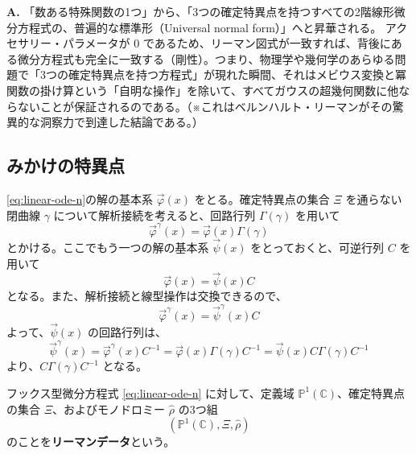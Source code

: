 \begin{Q}
\textbf{A.} 「数ある特殊関数の1つ」から、「3つの確定特異点を持つすべての2階線形微分方程式の、普遍的な標準形（Universal normal form）」へと昇華される。
アクセサリー・パラメータが $0$ であるため、リーマン図式が一致すれば、背後にある微分方程式も完全に一致する（剛性）。つまり、物理学や幾何学のあらゆる問題で「3つの確定特異点を持つ方程式」が現れた瞬間、それはメビウス変換と冪関数の掛け算という「自明な操作」を除いて、すべてガウスの超幾何関数に他ならないことが保証されるのである。（※これはベルンハルト・リーマンがその驚異的な洞察力で到達した結論である。）
\end{Q}

\subsection{みかけの特異点}
\eqref{eq:linear-ode-n}の解の基本系 $\vec{\varphi}(x)$ をとる。確定特異点の集合 $\Xi$ を通らない閉曲線 $\gamma$ について解析接続を考えると、回路行列 $\Gamma(\gamma)$ を用いて
\[
\vec{\varphi}^{\gamma}(x) = \vec{\varphi}(x)\Gamma(\gamma)
\]
とかける。ここでもう一つの解の基本系 $\vec{\psi}(x)$ をとっておくと、可逆行列 $C$ を用いて
\[
\vec{\varphi}(x) = \vec{\psi}(x)C
\]
となる。また、解析接続と線型操作は交換できるので、
\[
\vec{\varphi}^{\gamma}(x) = \vec{\psi}^{\gamma}(x)C
\]
よって、$\vec{\psi}(x)$ の回路行列は、
\[
\vec{\psi}^{\gamma}(x) = \vec{\varphi}^{\gamma}(x)C^{-1} = \vec{\varphi}(x)\Gamma(\gamma)C^{-1} = \vec{\psi}(x)C\Gamma(\gamma)C^{-1}
\]
より、$C\Gamma(\gamma)C^{-1}$ となる。

\begin{definition}[リーマンデータ]\label{def:riemann_data}
    フックス型微分方程式 \eqref{eq:linear-ode-n} に対して、定義域 $\mathbb{P}^{1}(\mathbb{C})$、確定特異点の集合 $\Xi$、およびモノドロミー $\hat{\rho}$ の3つ組
    \[
    (\mathbb{P}^{1}(\mathbb{C}), \Xi, \hat{\rho})
    \]
    のことを\textbf{リーマンデータ}という。
\end{definition}


